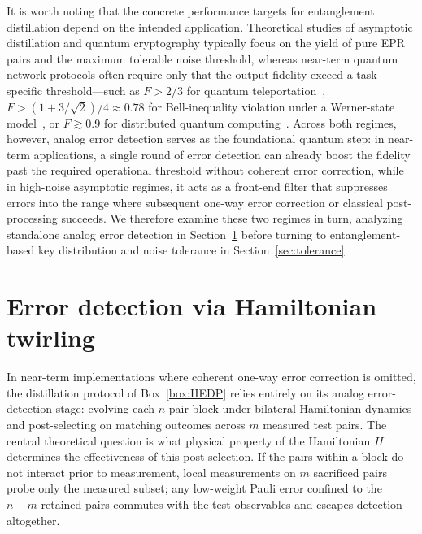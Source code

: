 \documentclass[onecolumn,prx,longbibliography,nofootinbib, superscriptaddress]{revtex4-2}
\theoremstyle{recap}
\begin{document}
It is worth noting that the concrete performance targets for entanglement distillation depend on the intended application. Theoretical studies of asymptotic distillation and quantum cryptography typically focus on the yield of pure EPR pairs and the maximum tolerable noise threshold, whereas near-term quantum network protocols often require only that the output fidelity exceed a task-specific threshold---such as $F > 2/3$ for quantum teleportation~\cite{Popescu95, Ma12teleportation}, $F > (1 + 3/\sqrt{2})/4 \approx 0.78$ for Bell-inequality violation under a Werner-state model~\cite{QuantumEntanglement}, or $F \gtrsim 0.9$ for distributed quantum computing~\cite{Wehner2018}. Across both regimes, however, analog error detection serves as the foundational quantum step: in near-term applications, a single round of error detection can already boost the fidelity past the required operational threshold without coherent error correction, while in high-noise asymptotic regimes, it acts as a front-end filter that suppresses errors into the range where subsequent one-way error correction or classical post-processing succeeds. We therefore examine these two regimes in turn, analyzing standalone analog error detection in Section~\ref{sec:main} before turning to entanglement-based key distribution and noise tolerance in Section~\ref{sec:tolerance}.

\section{Error detection via Hamiltonian twirling}\label{sec:main}

In near-term implementations where coherent one-way error correction is omitted, the distillation protocol of Box~\ref{box:HEDP} relies entirely on its analog error-detection stage: evolving each $n$-pair block under bilateral Hamiltonian dynamics and post-selecting on matching outcomes across $m$ measured test pairs. The central theoretical question is what physical property of the Hamiltonian $H$ determines the effectiveness of this post-selection. If the pairs within a block do not interact prior to measurement, local measurements on $m$ sacrificed pairs probe only the measured subset; any low-weight Pauli error confined to the $n-m$ retained pairs commutes with the test observables and escapes detection altogether.
\end{document}
